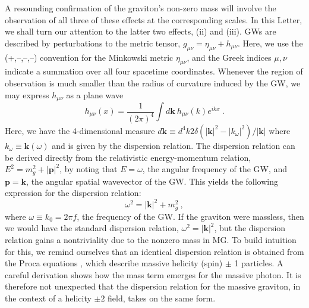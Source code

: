 \documentclass[prd,twocolumn,aps,psfig,nofootinbib,nobibnotes,superscriptaddress,preprintnumbers,times]{revtex4-2}
\begin{document}
A resounding confirmation of the graviton's non-zero mass will involve the observation of all three of these effects at the corresponding scales. In this Letter, we shall turn our attention to the latter two effects, (ii) and (iii). GWs are described by perturbations to the
metric tensor, $g_{\mu\nu} = \eta_{\mu\nu} + h_{\mu\nu}$.
Here, we use the (+,--,--,--) convention for the Minkowski metric $\eta_{\mu\nu}$, and the Greek indices $\mu,\nu$ indicate a summation over all four spacetime coordinates. Whenever the region of observation is much smaller than the radius of curvature induced by the GW, we may express $h_{\mu\nu}$ as a plane wave \cite{Isi:2018miq}
\begin{equation}\label{eqn:planewave}
    h_{\mu\nu}(x) = \frac{1}{(2\pi)^4}\int d\boldsymbol{k} \ h_{\mu\nu}(k) e^{ikx} \ .
\end{equation}
Here, we have the 4-dimensional measure $d\boldsymbol{k} \equiv d^4 k 2\delta(|\boldsymbol{k}|^2 - |k_{\omega}|^2)/|\boldsymbol{k}|$ where $k_{\omega} \equiv \boldsymbol{k}(\omega)$ and is given by the dispersion relation. The dispersion relation can be derived directly from the relativistic energy-momentum relation, $E^2 = m_g^2 + |{\boldsymbol{p}}|^2$, by noting that $E = \omega$, the angular frequency of the GW, and ${\boldsymbol{p}} = \boldsymbol{k}$, the angular spatial wavevector of the GW. This yields the following expression for the dispersion relation: 
\begin{equation}\label{eq:dispersion}
    \omega^2 = |\boldsymbol{k}|^2+ m_g^2 \ ,
\end{equation}
where $\omega \equiv k_0 = 2\pi f$, the frequency of the GW. If the graviton were massless, then we would have the standard dispersion relation, $\omega^2 = |\boldsymbol{k}|^2$, but the dispersion relation gains a nontriviality due to the nonzero mass in MG. 
To build intuition for this, we remind ourselves that an identical dispersion relation is obtained from the Proca equations \cite{Proca:1936fbw}, which describe massive helicity (spin) $\pm$ 1 particles. A careful derivation shows how the mass term emerges \cite{Wang:2024kir} for the massive photon. It is therefore not unexpected that the dispersion relation for the massive graviton, in the context of a helicity $\pm 2$ field, takes on the same form. 
\end{document}
